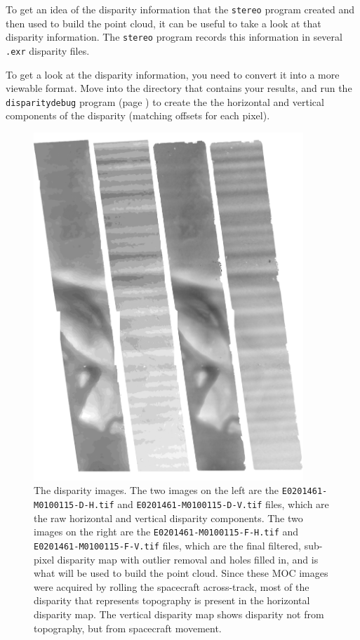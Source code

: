 To get an idea of the disparity information that the \texttt{stereo}
program created and then used to build the point cloud, it can be
useful to take a look at that disparity information.  The \texttt{stereo}
program records this information in several \texttt{.exr} disparity
files.

To get a look at the disparity information, you need to convert it
into a more viewable format.  Move into the directory that contains
your results, and run the \texttt{disparitydebug} program (page
\pageref{disparitydebug}) to create the the horizontal and vertical
components of the disparity (matching offsets for each pixel).

\begin{figure}[t!]
\begin{minipage}{4in}
\includegraphics[width=4in]{images/p19-disparity.png}
\end{minipage}
\hfill
\begin{minipage}{2.7in}
\caption[P19 disparity images]{
    \label{p19-disparity}
	The disparity images.  The two images on the left are the
	\texttt{E0201461-M0100115-D-H.tif} and
	\texttt{E0201461-M0100115-D-V.tif} files, which are the raw horizontal and
	vertical disparity components.  The two images on the right are the
	\texttt{E0201461-M0100115-F-H.tif} and
	\texttt{E0201461-M0100115-F-V.tif} files, which are the final
	filtered, sub-pixel disparity map with outlier removal and holes
	filled in, and is what will be used to build the point cloud.  Since
	these MOC images were acquired by rolling the spacecraft across-track,
	most of the disparity that represents topography is present in the
	horizontal disparity map.  The vertical disparity map shows disparity
	not from topography, but from spacecraft movement.
    }
\end{minipage}
\end{figure}

